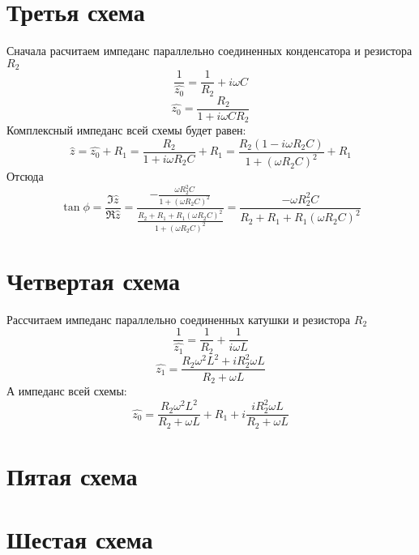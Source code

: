 \section{Третья схема}
\begin{center}

\end{center}
Сначала расчитаем импеданс параллельно соединенных конденсатора и резистора $R_2$
\begin{equation}
	\frac{1}{\hat{z_0}}=\frac{1}{R_2}+i\omega C
\end{equation}
\begin{equation}
	\hat{z_0}=\frac{R_2}{1+i \omega CR_2}
\end{equation}
Комплексный импеданс всей схемы будет равен:
\begin{equation}
	\hat{z}=\hat{z_0}+R_1=\frac{R_2}{1+i \omega R_2C}+R_1=
	\frac{R_2(1-i \omega R_2C)}{1+(\omega R_2C)^2}+R_1
\end{equation}
Отсюда
\begin{equation}
	\tan\phi = \frac{\Im\hat{z}}{\Re\hat{z}}=
	\frac{
		-\frac{\omega R_2^2C}{1+(\omega R_2C)^2}
	}{
		\frac{R_2+R_1+R_1(\omega R_2C)^2}{1+(\omega R_2C)^2}
	}=
	\frac{
		-\omega R_2^2C
	}{
		R_2+R_1+R_1(\omega R_2C)^2
	}	
\end{equation}


\section{Четвертая схема}
\begin{center}

\end{center}
Рассчитаем импеданс параллельно соединенных катушки и резистора $R_2$
\begin{equation}
	\frac{1}{\hat{z_1}}=\frac{1}{R_2}+\frac{1}{i\omega L}
\end{equation}
\begin{equation}
	\hat{z_1}=\frac{R_2\omega^2L^2+iR_2^2\omega L}{R_2+\omega L}
\end{equation}
А импеданс всей схемы:
\begin{equation}
	\hat{z_0}=\frac{R_2\omega^2L^2}{R_2+\omega L} + R_1+i\frac{iR_2^2\omega L}{R_2+\omega L}
\end{equation}


\section{Пятая схема}
\begin{center}

\end{center}



\section{Шестая схема}
\begin{center}

\end{center}


	


